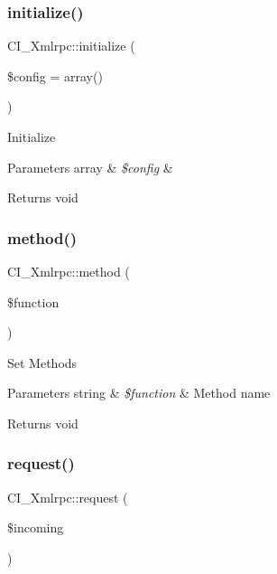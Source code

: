 \subsubsection{\texorpdfstring{initialize()}{initialize()}}
{\footnotesize\ttfamily C\+I\+\_\+\+Xmlrpc\+::initialize (\begin{DoxyParamCaption}\item[{}]{\$config = {\ttfamily array()} }\end{DoxyParamCaption})}

Initialize


\begin{DoxyParams}[1]{Parameters}
array & {\em \$config} & \\
\hline
\end{DoxyParams}
\begin{DoxyReturn}{Returns}
void 
\end{DoxyReturn}
\mbox{\label{class_c_i___xmlrpc_afd0597e1ae50c9e3ff42d23dcff82f71}} 
\subsubsection{\texorpdfstring{method()}{method()}}
{\footnotesize\ttfamily C\+I\+\_\+\+Xmlrpc\+::method (\begin{DoxyParamCaption}\item[{}]{\$function }\end{DoxyParamCaption})}

Set Methods


\begin{DoxyParams}[1]{Parameters}
string & {\em \$function} & Method name \\
\hline
\end{DoxyParams}
\begin{DoxyReturn}{Returns}
void 
\end{DoxyReturn}
\mbox{\label{class_c_i___xmlrpc_a55d527599e6e84ef0367fe66fb8e06f4}} 
\subsubsection{\texorpdfstring{request()}{request()}}
{\footnotesize\ttfamily C\+I\+\_\+\+Xmlrpc\+::request (\begin{DoxyParamCaption}\item[{}]{\$incoming }\end{DoxyParamCaption})}

